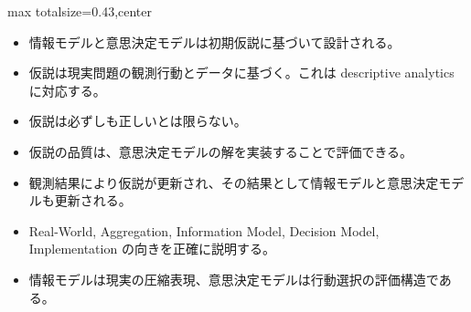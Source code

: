 \clearpage
{}
\begin{minipage}[t]{0.405\textwidth}
\begin{adjustbox}{max totalsize={\textwidth}{0.43\textheight},center}
\begin{minipage}{\textwidth}\scriptsize
{}\begin{itemize}
\item 情報モデルと意思決定モデルは初期仮説に基づいて設計される。
\item 仮説は現実問題の観測行動とデータに基づく。これは descriptive analytics に対応する。
\item 仮説は必ずしも正しいとは限らない。
\item 仮説の品質は、意思決定モデルの解を実装することで評価できる。
\item 観測結果により仮説が更新され、その結果として情報モデルと意思決定モデルも更新される。
\end{itemize}\begin{itemize}
\item Real-World, Aggregation, Information Model, Decision Model, Implementation の向きを正確に説明する。
\item 情報モデルは現実の圧縮表現、意思決定モデルは行動選択の評価構造である。
\end{itemize}
\end{minipage}
\end{adjustbox}
\end{minipage}\hfill
